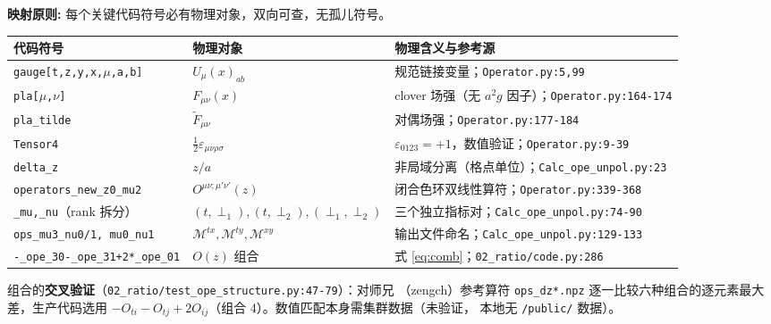 \documentclass[UTF8]{ctexart}
\begin{document}
\begin{mapbox}
\textbf{映射原则:} 每个关键代码符号必有物理对象，双向可查，无孤儿符号。
\end{mapbox}
\begin{xltabular}{\textwidth}{llX}
\toprule
\textcolor{map}{代码符号} & 物理对象 & 物理含义与参考源 \\
\midrule
\endhead
\texttt{gauge[t,z,y,x,$\mu$,a,b]} & $U_\mu(x)_{ab}$ & 规范链接变量；\texttt{\nolinkurl{Operator.py:5,99}} \\
\texttt{pla[$\mu$,$\nu$]} & $F_{\mu\nu}(x)$ & clover 场强（无 $a^2g$ 因子）；\texttt{\nolinkurl{Operator.py:164-174}} \\
\texttt{pla\_tilde} & $\tilde F_{\mu\nu}$ & 对偶场强；\texttt{\nolinkurl{Operator.py:177-184}} \\
\texttt{Tensor4} & $\tfrac12\varepsilon_{\mu\nu\rho\sigma}$ & $\varepsilon_{0123}=+1$，数值验证；\texttt{\nolinkurl{Operator.py:9-39}} \\
\texttt{delta\_z} & $z/a$ & 非局域分离（格点单位）；\texttt{\nolinkurl{Calc_ope_unpol.py:23}} \\
\texttt{operators\_new\_z0\_mu2} & $O^{\mu\nu;\mu'\nu'}(z)$ & 闭合色环双线性算符；\texttt{\nolinkurl{Operator.py:339-368}} \\
\texttt{\_mu,\_nu}（rank 拆分） & $(t,\perp_1),(t,\perp_2),(\perp_1,\perp_2)$ & 三个独立指标对；\texttt{\nolinkurl{Calc_ope_unpol.py:74-90}} \\
\texttt{ops\_mu3\_nu0/1, mu0\_nu1} & $\mathcal{M}^{tx},\mathcal{M}^{ty},\mathcal{M}^{xy}$ & 输出文件命名；\texttt{\nolinkurl{Calc_ope_unpol.py:129-133}} \\
\texttt{-\_ope\_30-\_ope\_31+2*\_ope\_01} & $O(z)$ 组合 & 式 \eqref{eq:comb}；\texttt{\nolinkurl{02_ratio/code.py:286}} \\
\bottomrule
\end{xltabular}

组合的\textbf{交叉验证}（\texttt{\nolinkurl{02_ratio/test_ope_structure.py:47-79}}）：对师兄
（zengch）参考算符 \texttt{ops\_dz*.npz} 逐一比较六种组合的逐元素最大差，生产代码选用
$-O_{ti}-O_{tj}+2O_{ij}$（组合 4）。数值匹配本身需集群数据（\textcolor{warn}{未验证}，
本地无 \texttt{/public/} 数据）。




\end{document}
